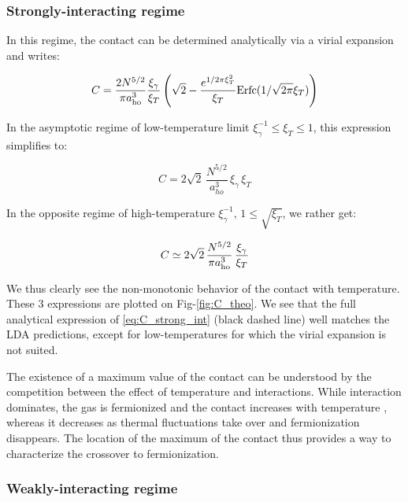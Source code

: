 \subsubsection{Strongly-interacting regime}

In this regime, the contact can be determined analytically via a virial expansion \cite{vignolo2013universal} and writes:

\begin{equation}
    C = \frac{2 N^{5/2}}{\pi a_{\rm{ho}}^3} \frac{\xi_\gamma}{\xi_T} \left( \sqrt{2} - \frac{e^{1/2 \pi \xi_T^2}}{\xi_T} \textrm{Erfc}(1/\sqrt{2 \pi} \xi_T) \right)
    \label{eq:C_strong_int}
\end{equation}

In the asymptotic regime of low-temperature limit $\xi_\gamma^{-1} \leq \xi_T \leq 1$, this expression simplifies to:

\begin{equation}
    C = 2 \sqrt{2} \, \frac{N^{5/2}}{a_{ho}^3} \, \xi_\gamma \, \xi_T 
    \label{eq:strong_int_lowT}
\end{equation}

\noindent In the opposite regime of high-temperature $\xi_\gamma^{-1}, \, 1 \leq \sqrt{\xi_T}$, we rather get:

\begin{equation}
    C \simeq 2 \sqrt{2} \, \frac{N^{5/2}}{ \pi a_{\rm{ho}}^3} \, \frac{\xi_\gamma}{\xi_T} 
    \label{eq:strong_int_highT}
\end{equation}

\noindent We thus clearly see the non-monotonic behavior of the contact with temperature. These 3 expressions are plotted on Fig-\ref{fig:C_theo}. We see that the full analytical expression of \ref{eq:C_strong_int} (black dashed line) well matches the LDA predictions, except for low-temperatures for which the virial expansion is not suited.

The existence of a maximum value of the contact can be understood by the competition between the effect of temperature and interactions. While interaction dominates, the gas is fermionized and the contact increases with temperature \cite{vignolo2013universal}, whereas it decreases as thermal fluctuations take over and fermionization disappears. The location of the maximum of the contact thus provides a way to characterize the crossover to fermionization. 

\subsubsection{Weakly-interacting regime}

